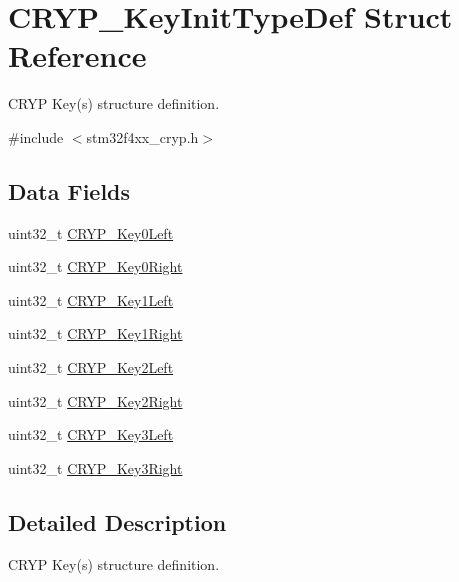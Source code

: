 \hypertarget{struct_c_r_y_p___key_init_type_def}{\section{C\-R\-Y\-P\-\_\-\-Key\-Init\-Type\-Def Struct Reference}
\label{struct_c_r_y_p___key_init_type_def}
}


C\-R\-Y\-P Key(s) structure definition.  




{\ttfamily \#include $<$stm32f4xx\-\_\-cryp.\-h$>$}

\subsection*{Data Fields}
\begin{DoxyCompactItemize}
\item 
uint32\-\_\-t \hyperlink{struct_c_r_y_p___key_init_type_def_a54f07204c4708d9704997be2b489a4b4}{C\-R\-Y\-P\-\_\-\-Key0\-Left}
\item 
uint32\-\_\-t \hyperlink{struct_c_r_y_p___key_init_type_def_a03039088b171c114f907971e0e2246eb}{C\-R\-Y\-P\-\_\-\-Key0\-Right}
\item 
uint32\-\_\-t \hyperlink{struct_c_r_y_p___key_init_type_def_aeb4a4df9faa0da133ddc0bf0523bcb30}{C\-R\-Y\-P\-\_\-\-Key1\-Left}
\item 
uint32\-\_\-t \hyperlink{struct_c_r_y_p___key_init_type_def_a09997dd36e6eeefbf46059c3d93b91ac}{C\-R\-Y\-P\-\_\-\-Key1\-Right}
\item 
uint32\-\_\-t \hyperlink{struct_c_r_y_p___key_init_type_def_a132c3310aa310d86aad98d277af3089f}{C\-R\-Y\-P\-\_\-\-Key2\-Left}
\item 
uint32\-\_\-t \hyperlink{struct_c_r_y_p___key_init_type_def_acada4f6eb7839b407f6cd197cf891f17}{C\-R\-Y\-P\-\_\-\-Key2\-Right}
\item 
uint32\-\_\-t \hyperlink{struct_c_r_y_p___key_init_type_def_abc13841eebf8bd578a408b7c4ea1fb94}{C\-R\-Y\-P\-\_\-\-Key3\-Left}
\item 
uint32\-\_\-t \hyperlink{struct_c_r_y_p___key_init_type_def_a5863a834aaae2bd010fdee6663cb64b7}{C\-R\-Y\-P\-\_\-\-Key3\-Right}
\end{DoxyCompactItemize}


\subsection{Detailed Description}
C\-R\-Y\-P Key(s) structure definition. 

